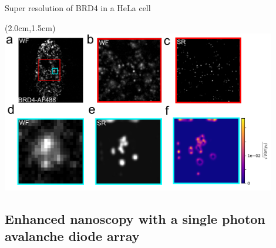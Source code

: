 \documentclass{beamer}					%
\begin{document}

\begin{frame}{Super resolution of BRD4 in a HeLa cell}
\begin{textblock*}{12cm}(2.0cm,1.5cm)
\includegraphics[width=12cm]{../../ddpm/ddpm/media/BRD4/Deep2.png}
\end{textblock*}


\end{frame}

\subsection{Enhanced nanoscopy with a single photon avalanche diode array}
\end{document}
